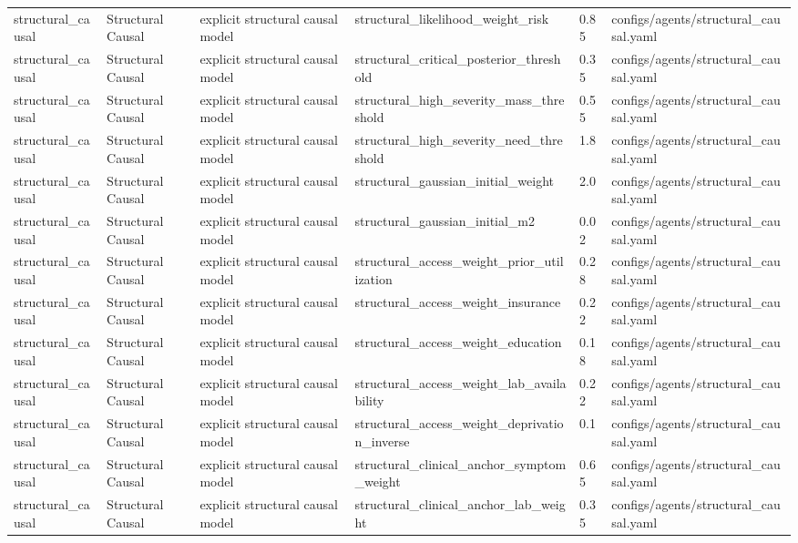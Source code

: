 \begin{tabular}{llllll}
structural\_causal & Structural Causal & explicit structural causal model & structural\_likelihood\_weight\_risk & 0.85 & configs/agents/structural\_causal.yaml \\
structural\_causal & Structural Causal & explicit structural causal model & structural\_critical\_posterior\_threshold & 0.35 & configs/agents/structural\_causal.yaml \\
structural\_causal & Structural Causal & explicit structural causal model & structural\_high\_severity\_mass\_threshold & 0.55 & configs/agents/structural\_causal.yaml \\
structural\_causal & Structural Causal & explicit structural causal model & structural\_high\_severity\_need\_threshold & 1.8 & configs/agents/structural\_causal.yaml \\
structural\_causal & Structural Causal & explicit structural causal model & structural\_gaussian\_initial\_weight & 2.0 & configs/agents/structural\_causal.yaml \\
structural\_causal & Structural Causal & explicit structural causal model & structural\_gaussian\_initial\_m2 & 0.02 & configs/agents/structural\_causal.yaml \\
structural\_causal & Structural Causal & explicit structural causal model & structural\_access\_weight\_prior\_utilization & 0.28 & configs/agents/structural\_causal.yaml \\
structural\_causal & Structural Causal & explicit structural causal model & structural\_access\_weight\_insurance & 0.22 & configs/agents/structural\_causal.yaml \\
structural\_causal & Structural Causal & explicit structural causal model & structural\_access\_weight\_education & 0.18 & configs/agents/structural\_causal.yaml \\
structural\_causal & Structural Causal & explicit structural causal model & structural\_access\_weight\_lab\_availability & 0.22 & configs/agents/structural\_causal.yaml \\
structural\_causal & Structural Causal & explicit structural causal model & structural\_access\_weight\_deprivation\_inverse & 0.1 & configs/agents/structural\_causal.yaml \\
structural\_causal & Structural Causal & explicit structural causal model & structural\_clinical\_anchor\_symptom\_weight & 0.65 & configs/agents/structural\_causal.yaml \\
structural\_causal & Structural Causal & explicit structural causal model & structural\_clinical\_anchor\_lab\_weight & 0.35 & configs/agents/structural\_causal.yaml \\

\end{tabular}
